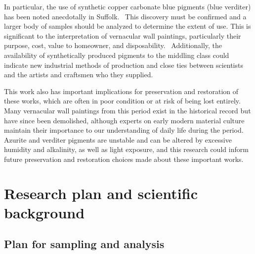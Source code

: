 In particular, the use of synthetic copper carbonate blue pigments (blue verditer) has been noted anecdotally in Suffolk.~\cite{baird, others you need to find} This discovery must be confirmed and a larger body of samples should be analyzed to determine the extent of use. This is significant to the interpretation of vernacular wall paintings, particularly their purpose, cost, value to homeowner, and disposability.~\cite{baird,davies} Additionally, the availability of synthetically produced pigments to the middling class could indicate new industrial methods of production and close ties between scientists and the artists and craftsmen who they supplied. 

This work also has important implications for preservation and restoration of these works, which are often in poor condition or at risk of being lost entirely. Many vernacular wall paintings from this period exist in the historical record but have since been demolished, although experts on early modern material culture maintain their importance to our understanding of daily life during the period.~\cite{davies,a day at home,benton 1, benton 2} Azurite and verditer pigments are unstable and can be altered by excessive humidity and alkalinity, as well as light exposure, and this research could inform future preservation and restoration choices made about these important works.~\cite{humidity paper, alkalinity paper, degradation products paper, light needs a reference}

\section[Research plan and scientific background]{Research plan and scientific background}
\label{section1.2}

\subsection[Plan for sampling and analysis]{Plan for sampling and analysis}
\label{subsection1.2.1}


